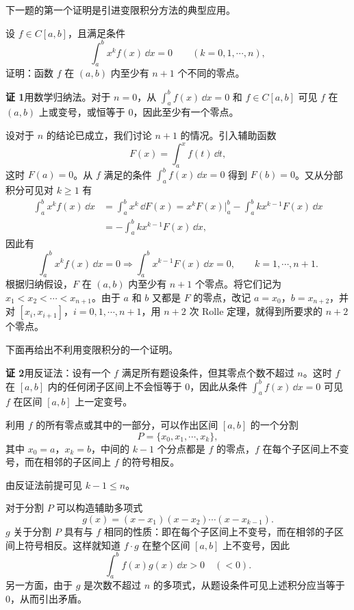 下一题的第一个证明是引进变限积分方法的典型应用。

\begin{xexample}[10.3.3]
设 $f\in C[a,b]$，且满足条件
\[
  \int_a^b x^k f(x)\,\dd x=0\qquad(k=0,1,\cdots,n),
\]
证明：函数 $f$ 在 $(a,b)$ 内至少有 $n+1$ 个不同的零点。
\end{xexample}
\begin{xsolution}
\textbf{证 1}\quad 用数学归纳法。对于 $n=0$，从 $\int_a^b f(x)\,\dd x=0$ 和 $f\in C[a,b]$ 可见 $f$ 在 $(a,b)$ 上或变号，或恒等于 0，因此至少有一个零点。

设对于 $n$ 的结论已成立，我们讨论 $n+1$ 的情况。引入辅助函数
\[
  F(x)=\int_a^x f(t)\,\dd t,
\]
这时 $F(a)=0$。从 $f$ 满足的条件 $\int_a^b f(x)\,\dd x=0$ 得到 $F(b)=0$。又从分部积分可见对 $k\geqslant1$ 有
\begin{align*}
  \int_a^b x^k f(x)\,\dd x
  &=\int_a^b x^k\,\dd F(x)
  =x^kF(x)\Big|_a^b-\int_a^b kx^{k-1}F(x)\,\dd x\\
  &=-\int_a^b kx^{k-1}F(x)\,\dd x,
\end{align*}
因此有
\[
  \int_a^b x^k f(x)\,\dd x=0
  \Longrightarrow
  \int_a^b x^{k-1}F(x)\,\dd x=0,
  \qquad k=1,\cdots,n+1.
\]
根据归纳假设，$F$ 在 $(a,b)$ 内至少有 $n+1$ 个零点。将它们记为 $x_1<x_2<\cdots<x_{n+1}$。由于 $a$ 和 $b$ 又都是 $F$ 的零点，改记 $a=x_0$，$b=x_{n+2}$，并对 $[x_i,x_{i+1}]$，$i=0,1,\cdots,n+1$，用 $n+2$ 次 Rolle 定理，就得到所要求的 $n+2$ 个零点。

下面再给出不利用变限积分的一个证明。

\textbf{证 2}\quad 用反证法：设有一个 $f$ 满足所有题设条件，但其零点个数不超过 $n$。这时 $f$ 在 $[a,b]$ 内的任何闭子区间上不会恒等于 0，因此从条件 $\int_a^b f(x)\,\dd x=0$ 可见 $f$ 在区间 $[a,b]$ 上一定变号。

利用 $f$ 的所有零点或其中的一部分，可以作出区间 $[a,b]$ 的一个分割
\[
  P=\{x_0,x_1,\cdots,x_k\},
\]
其中 $x_0=a$，$x_k=b$，中间的 $k-1$ 个分点都是 $f$ 的零点，$f$ 在每个子区间上不变号，而在相邻的子区间上 $f$ 的符号相反。

由反证法前提可见 $k-1\leqslant n$。

对于分割 $P$ 可以构造辅助多项式
\[
  g(x)=(x-x_1)(x-x_2)\cdots(x-x_{k-1}).
\]
$g$ 关于分割 $P$ 具有与 $f$ 相同的性质：即在每个子区间上不变号，而在相邻的子区间上符号相反。这样就知道 $f\cdot g$ 在整个区间 $[a,b]$ 上不变号，因此
\[
  \int_a^b f(x)g(x)\,\dd x>0\quad(<0).
\]
另一方面，由于 $g$ 是次数不超过 $n$ 的多项式，从题设条件可见上述积分应当等于 0，从而引出矛盾。
\end{xsolution}

